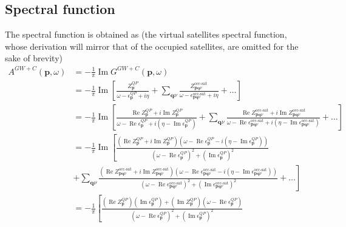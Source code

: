 \subsection{Spectral function}
The spectral function is obtained as (the virtual satellites spectral function, whose derivation will mirror that of the occupied satellites, are omitted for the sake of brevity)
\begin{align}
A^{GW+C}(\bm{p}, \omega) & = -\frac{1}{\pi} \operatorname{Im} G^{GW+C}(\bm{p}, \omega) \\
& = -\frac{1}{\pi} \operatorname{Im}\left[\frac{Z_{\bm{p}}^{QP}}{\omega - \epsilon_{\bm{p}}^{QP} + i\eta} + \sum_{\bm{q}\nu} \frac{Z_{\bm{p}\bm{q}\nu}^{\text{occ-sat}}}{\omega - \epsilon_{\bm{p}\bm{q}\nu}^{\text{occ-sat}} + i\eta} + \ldots \right] \\
& = -\frac{1}{\pi} \operatorname{Im}\left[\frac{\operatorname{Re} Z_{\bm{p}}^{QP} + i \operatorname{Im} Z_{\bm{p}}^{QP}}{\omega - \operatorname{Re} \epsilon_{\bm{p}}^{QP} + i\left(\eta - \operatorname{Im} \epsilon_{\bm{p}}^{QP}\right)} + \sum_{\bm{q}\nu} \frac{\operatorname{Re} Z_{\bm{p}\bm{q}\nu}^{\text{occ-sat}} + i \operatorname{Im} Z_{\bm{p}\bm{q}\nu}^{\text{occ-sat}}}{\omega - \operatorname{Re} \epsilon_{\bm{p}\bm{q}\nu}^{\text{occ-sat}} + i\left(\eta - \operatorname{Im} \epsilon_{\bm{p}\bm{q}\nu}^{\text{occ-sat}}\right)} + \ldots \right] \\
& = -\frac{1}{\pi} \operatorname{Im}\left[\frac{\left(\operatorname{Re} Z_{\bm{p}}^{QP} + i \operatorname{Im} Z_{\bm{p}}^{QP}\right)\left(\omega - \operatorname{Re} \epsilon_{\bm{p}}^{QP} - i\left(\eta - \operatorname{Im} \epsilon_{\bm{p}}^{QP}\right)\right)}{\left(\omega - \operatorname{Re} \epsilon_{\bm{p}}^{QP}\right)^2 + \left(\operatorname{Im} \epsilon_{\bm{p}}^{QP}\right)^2}\right.\\
& \left. + \sum_{\bm{q}\nu} \frac{\left(\operatorname{Re} Z_{\bm{p}\bm{q}\nu}^{\text{occ-sat}} + i \operatorname{Im} Z_{\bm{p}\bm{q}\nu}^{\text{occ-sat}}\right)\left(\omega - \operatorname{Re} \epsilon_{\bm{p}\bm{q}\nu}^{\text{occ-sat}} - i\left(\eta - \operatorname{Im} \epsilon_{\bm{p}\bm{q}\nu}^{\text{occ-sat}}\right)\right)}{\left(\omega - \operatorname{Re} \epsilon_{\bm{p}\bm{q}\nu}^{\text{occ-sat}}\right)^2 + \left(\operatorname{Im} \epsilon_{\bm{p}\bm{q}\nu}^{\text{occ-sat}}\right)^2} + \ldots \right] \\
& = -\frac{1}{\pi}\left[\frac{\left(\operatorname{Re} Z_{\bm{p}}^{QP}\right)\left(\operatorname{Im} \epsilon_{\bm{p}}^{QP}\right) + \left(\operatorname{Im} Z_{\bm{p}}^{QP}\right)\left(\omega - \operatorname{Re} \epsilon_{\bm{p}}^{QP}\right)}{\left(\omega - \operatorname{Re} \epsilon_{\bm{p}}^{QP}\right)^2 + \left(\operatorname{Im} \epsilon_{\bm{p}}^{QP}\right)^2}\right.\\

\end{align}
